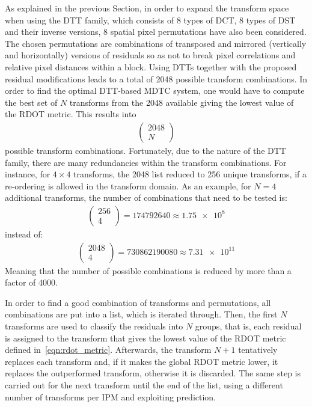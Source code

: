\documentclass[11pt,a4paper,openright,twoside]{book}
\numberwithin{equation}{section} %
\numberwithin{figure}{section} %
\numberwithin{table}{section} %
\begin{document}
As explained in the previous Section, in order to expand the transform space
when using the \ac{DTT} family, which consists of 8 types of \ac{DCT}, 8 types
of \ac{DST} and their inverse versions, 8 spatial pixel permutations have also
been considered.
The chosen permutations are combinations of transposed and mirrored
(vertically and horizontally) versions of residuals so as not to break pixel
correlations and relative pixel distances within a block.
Using \acp{DTT} together with the proposed residual modifications leads to a
total of 2048 possible transform combinations.
In order to find the optimal \acs{DTT}-based \ac{MDTC} system, one would have
to compute the best set of $N$ transforms from the 2048 available giving the
lowest value of the \ac{RDOT} metric.
This results into
\begin{align}
	\begin{pmatrix}
		2048 \\
		N
	\end{pmatrix}
\end{align}
possible transform combinations.
Fortunately, due to the nature of the \ac{DTT} family, there are many
redundancies within the transform combinations.
For instance, for $4\times4$ transforms, the 2048 list reduced to 256
unique transforms, if a re-ordering is allowed in the transform domain.
As an example, for $N=4$ additional transforms, the number of combinations
that need to be tested is:
\begin{align}
	\begin{pmatrix}
		256 \\
		4
	\end{pmatrix} =
	\num{174792640}\approx\num{1.75e8}
\end{align}
instead of:
\begin{align}
	\left(
	\begin{matrix}
		2048 \\
		4
	\end{matrix}
	\right) =
	\num{730862190080}\approx\num{7.31e11}
\end{align}
Meaning that the number of possible combinations is reduced by more than a
factor of 4000.

In order to find a good combination of transforms and permutations, all
combinations are put into a list, which is iterated through.
Then, the first $N$ transforms are used to classify the residuals into $N$
groups, that is, each residual is assigned to the transform that gives the
lowest value of the \ac{RDOT} metric defined in~\eqref{eqn:rdot_metric}.
Afterwards, the transform $N+1$ tentatively replaces each transform and, if it
makes the global \acs{RDOT} metric lower, it replaces the outperformed
transform, otherwise it is discarded.
The same step is carried out for the next transform until the end of the list,
using a different number of transforms per \ac{IPM} and exploiting prediction.
\end{document}
